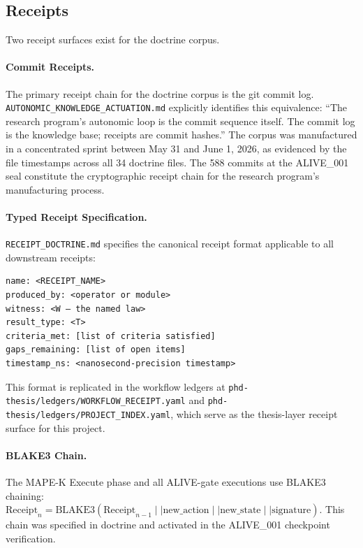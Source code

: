 \subsection{Receipts}
\label{sec:doctrine-evidence-receipts}

Two receipt surfaces exist for the doctrine corpus.

\paragraph{Commit Receipts.} The primary receipt chain for the doctrine corpus is the git
commit log. \texttt{AUTONOMIC\_KNOWLEDGE\_ACTUATION.md} explicitly identifies this
equivalence: ``The research program's autonomic loop is the commit sequence itself. The commit
log is the knowledge base; receipts are commit hashes.'' The corpus was manufactured in a
concentrated sprint between May 31 and June 1, 2026, as evidenced by the file timestamps
across all 34 doctrine files. The 588 commits at the ALIVE\_001 seal constitute the
cryptographic receipt chain for the research program's manufacturing process.

\paragraph{Typed Receipt Specification.} \texttt{RECEIPT\_DOCTRINE.md} specifies the
canonical receipt format applicable to all downstream receipts:

\begin{verbatim}
name: <RECEIPT_NAME>
produced_by: <operator or module>
witness: <W — the named law>
result_type: <T>
criteria_met: [list of criteria satisfied]
gaps_remaining: [list of open items]
timestamp_ns: <nanosecond-precision timestamp>
\end{verbatim}

This format is replicated in the workflow ledgers at
\texttt{phd-thesis/ledgers/WORKFLOW\_RECEIPT.yaml} and
\texttt{phd-thesis/ledgers/PROJECT\_INDEX.yaml}, which serve as the thesis-layer receipt
surface for this project.

\paragraph{BLAKE3 Chain.} The MAPE-K Execute phase and all ALIVE-gate executions use BLAKE3
chaining: $\text{Receipt}_n = \text{BLAKE3}(\text{Receipt}_{n-1} \mid\mid
\text{new\_action} \mid\mid \text{new\_state} \mid\mid \text{signature})$. This chain was
specified in doctrine and activated in the ALIVE\_001 checkpoint verification.

